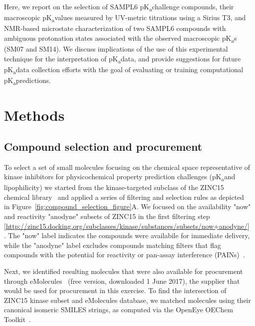 \documentclass[9pt,lineno]{elife}
\newcommand{\pKa}{pK\textsubscript{a}}
\begin{document}
Here, we report on the selection of SAMPL6 \pKa challenge compounds, their macroscopic \pKa values measured by UV-metric titrations using a Sirius T3, and NMR-based microstate characterization of two SAMPL6 compounds with ambiguous protonation states associated with the observed macroscopic \pKa s (SM07 and SM14). 
We discuss implications of the use of this experimental technique for the interpretation of \pKa data, and provide suggestions for future \pKa data collection efforts with the goal of evaluating or training computational \pKa predictions.

\section{Methods}

\subsection{Compound selection and procurement}

To select a set of small molecules focusing on the chemical space representative of kinase inhibitors for physicochemical property prediction challenges (\pKa and lipophilicity) we started from the kinase-targeted subclass of the ZINC15 chemical library~\citep{sterling_zinc_2015} and applied a series of filtering and selection rules as depicted in Figure~\ref{fig:compound_selection_figure}A. 
We focused on the availability "now" and reactivity "anodyne" subsets of ZINC15 in the first filtering step [\url{http://zinc15.docking.org/subclasses/kinase/substances/subsets/now+anodyne/}]. 
The "now" label indicates the compounds were availabile for immediate delivery, while the "anodyne" label excludes compounds matching filters that flag compounds with the potential for reactivity or pan-assay interference (PAINs)~\citep{baell_new_2010, saubern_knime_2011}. 

Next, we identified resulting molecules that were also available for procurement through eMolecules~\citep{eMolecules_ref_2017} (free version, downloaded 1 June 2017), the supplier that would be used for procurement in this exercise. 
To find the intersection of ZINC15 kinase subset and eMolecules database, we matched molecules using their canonical isomeric SMILES strings, as computed via the OpenEye OEChem Toolkit~\citep{oechem_openeye_2017}. 
\end{document}
